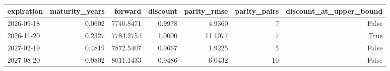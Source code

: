 \begin{tabular}{lrrrrrr}
\toprule
expiration & maturity\_years & forward & discount & parity\_rmse & parity\_pairs & discount\_at\_upper\_bound \\
\midrule
2026-09-18 & 0.0602 & 7740.8471 & 0.9978 & 4.9360 & 7 & False \\
2026-11-20 & 0.2327 & 7784.2754 & 1.0000 & 11.1077 & 7 & True \\
2027-02-19 & 0.4819 & 7872.5407 & 0.9667 & 1.9225 & 5 & False \\
2027-08-20 & 0.9802 & 8011.1433 & 0.9486 & 6.0432 & 10 & False \\
\bottomrule
\end{tabular}
